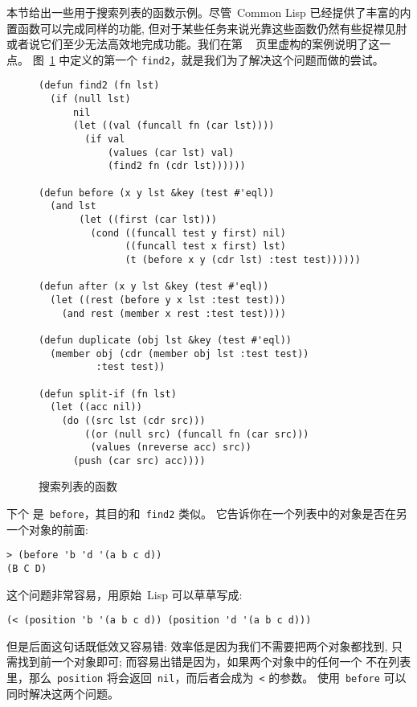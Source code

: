 本节给出一些用于搜索列表的函数示例。尽管~Common Lisp 已经提供了丰富的内置函数可以完成同样的功能,
但对于某些任务来说光靠这些函数仍然有些捉襟见肘\pozhehao{}或者说它们至少无法高效地完成功能。我们在第
~\pageref{page:nicknames} 页里虚构的案例说明了这一点。
图~\ref{fig:functions_which_search_lists} 中定义的第一个\utility{}
\texttt{find2}，就是我们为了解决这个问题而做的尝试。

\begin{figure}
\begin{lstlisting}
(defun find2 (fn lst)
  (if (null lst)
      nil
      (let ((val (funcall fn (car lst))))
        (if val
            (values (car lst) val)
            (find2 fn (cdr lst))))))

(defun before (x y lst &key (test #'eql))
  (and lst
       (let ((first (car lst)))
         (cond ((funcall test y first) nil)
               ((funcall test x first) lst)
               (t (before x y (cdr lst) :test test))))))

(defun after (x y lst &key (test #'eql))
  (let ((rest (before y x lst :test test)))
    (and rest (member x rest :test test))))

(defun duplicate (obj lst &key (test #'eql))
  (member obj (cdr (member obj lst :test test))
          :test test))

(defun split-if (fn lst)
  (let ((acc nil))
    (do ((src lst (cdr src)))
        ((or (null src) (funcall fn (car src)))
         (values (nreverse acc) src))
      (push (car src) acc))))
\end{lstlisting}
\caption{\label{fig:functions_which_search_lists}
  搜索列表的函数}
\end{figure}

下个\utility{} 是~\texttt{before}，其目的和~\verb|find2| 类似。
它告诉你在一个列表中的对象是否在另一个对象的前面:
\begin{lstlisting}
> (before 'b 'd '(a b c d))
(B C D)
\end{lstlisting}
这个问题非常容易，用原始~Lisp 可以草草写成:
\begin{lstlisting}
(< (position 'b '(a b c d)) (position 'd '(a b c d)))
\end{lstlisting}
但是后面这句话既低效又容易错: 效率低是因为我们不需要把两个对象都找到,
只需找到前一个对象即可; 而容易出错是因为，如果两个对象中的任何一个
不在列表里，那么~\texttt{position} 将会返回~\texttt{nil}，而后者会成为~\texttt{<} 的参数。
使用~\texttt{before} 可以同时解决这两个问题。

